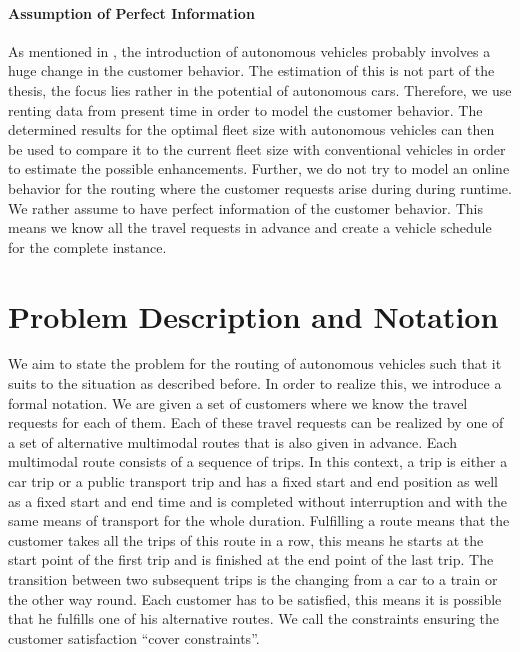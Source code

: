 \paragraph{Assumption of Perfect Information} \parfill

As mentioned in , the introduction of autonomous vehicles probably involves a huge change in the customer behavior. The estimation of this is not part of the thesis, the focus lies rather in the potential of autonomous cars. Therefore, we use renting data from present time in order to model the customer behavior. The determined results for the optimal fleet size with autonomous vehicles can then be used to compare it to the current fleet size with conventional vehicles in order to estimate the possible enhancements. Further, we do not try to model an online behavior for the routing where the customer requests arise during during runtime. We rather assume to have perfect information of the customer behavior. This means we know all the travel requests in advance and create a vehicle schedule for the complete instance.


\section{Problem Description and Notation}
\label{sec:problem_description}

We aim to state the problem for the routing of autonomous vehicles such that it suits to the situation as described before. In order to realize this, we introduce a formal notation. We are given a set of customers where we know the travel requests for each of them. Each of these travel requests can be realized by one of a set of alternative multimodal routes that is also given in advance. Each multimodal route consists of a sequence of trips. In this context, a trip is either a car trip or a public transport trip and has a fixed start and end position as well as a fixed start and end time and is completed without interruption and with the same means of transport for the whole duration. Fulfilling a route means that the customer takes all the trips of this route in a row, this means he starts at the start point of the first trip and is finished at the end point of the last trip. The transition between two subsequent trips is the changing from a car to a train or the other way round. Each customer has to be satisfied, this means it is possible that he fulfills one of his alternative routes. We call the constraints ensuring the customer satisfaction \enquote{cover constraints}.

